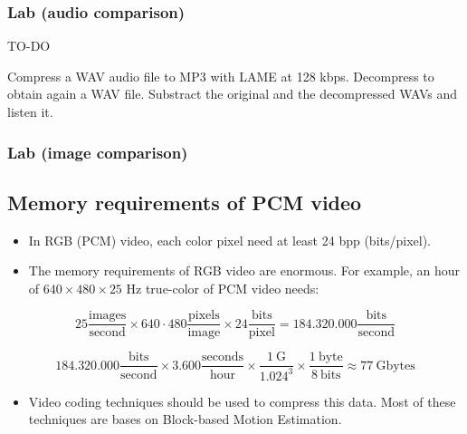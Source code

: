 \subsubsection{Lab (audio comparison)}

TO-DO

Compress a WAV audio file to MP3 with LAME at 128 kbps. Decompress to
obtain again a WAV file. Substract the original and the decompressed
WAVs and listen it.

\subsubsection{Lab (image comparison)}
\href{}{}

\subsection{Memory requirements of PCM video}

\begin{itemize}
\item
  In RGB (PCM) video, each color pixel need at least 24 bpp
  (bits/pixel).
\item
  The memory requirements of RGB video are enormous. For example, an
  hour of \(640\times 480\times 25\) Hz true-color of PCM video needs:
\end{itemize}

\begin{equation}
    25\frac{\text{images}}{\text{second}}\times
    640\cdot 480\frac{\text{pixels}}{\text{image}}\times
    24\frac{\text{bits}}{\text{pixel}}=
    184{.}320{.}000\frac{\text{bits}}{\text{second}}
\end{equation}

\begin{equation}
    184{.}320{.}000\frac{\text{bits}}{\text{second}} \times
    3{.}600\frac{\text{seconds}}{\text{hour}} \times
    \frac{1~\text{G}}{1{.}024^3}\times
    \frac{1~\text{byte}}{8~\text{bits}} \approx
    77~\text{Gbytes}
\end{equation}

\begin{itemize}
\tightlist
\item
  Video coding techniques should be used to compress this data. Most of
  these techniques are bases on Block-based Motion Estimation.
\end{itemize}

